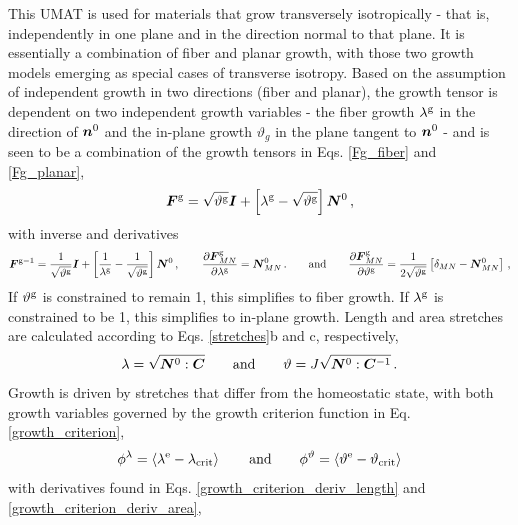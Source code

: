 \documentclass[10pt,letterpaper,oneside]{report}
\newcommand{\ten}[1]{\mbox{\boldmath $#1$}{}}
\newcommand{\scas}[1]{\mbox{{\scriptsize{${\rm{#1}}$}}}{}}
\begin{document}
This UMAT is used for materials that grow transversely isotropically - that is, independently in one plane and in the direction normal to that plane.  It is essentially a combination of fiber and planar growth, with those two growth models emerging as special cases of transverse isotropy.  Based on the assumption of independent growth in two directions (fiber and planar), the growth tensor is dependent on two independent growth variables - the fiber growth $\lambda^{\scas{g}}$ in the direction of $\ten{n}^0$ and the in-plane growth $\vartheta_g$ in the plane tangent to $\ten{n}^0$ - and is seen to be a combination of the growth tensors in Eqs. \ref{Fg_fiber} and \ref{Fg_planar},
\begin{equation}
\ten{F}^{\scas{g}} = \sqrt{\vartheta^{\scas{g}}} \ten{I} + \left[ \lambda^{\scas{g}} - \sqrt{\vartheta^{\scas{g}}} \right] \ten{N}^0 \, , 
\end{equation} 
with inverse and derivatives 
\begin{equation}
\ten{F}^{\scas{g}-1} = \frac{1}{\sqrt{\vartheta^{\scas{g}}}} \ten{I} + \left[ \frac{1}{\lambda^{\scas{g}}} - \frac{1}{\sqrt{\vartheta^{\scas{g}}}} \right] \ten{N}^0 \, ,
\qquad
\frac{\partial \ten{F}^{\scas{g}}_{MN} }{\partial \lambda^{\scas{g}}} = \ten{N}^0_{MN} \, .  
\qquad \mbox{and} \qquad
\frac{\partial \ten{F}^{\scas{g}}_{MN} }{\partial \vartheta^{\scas{g}}} = \frac{1}{2\sqrt{\vartheta^{\scas{g}}}} \left[ \delta_{MN} - \ten{N}^0_{MN} \right] \, ,
\end{equation}
If $\vartheta^{\scas{g}}$ is constrained to remain 1, this simplifies to fiber growth.  If $\lambda^{\scas{g}}$ is constrained to be 1, this simplifies to in-plane growth.  
Length and area stretches are calculated according to Eqs. \ref{stretches}b and c, respectively,
\begin{equation*}
\lambda = \sqrt{ \ten{N}^0 : \ten{C} } 
\qquad \mbox{and} \qquad 
\vartheta = J \sqrt{ \ten{N}^0 : \ten{C}^{-1} } \, . 
\end{equation*}
Growth is driven by stretches that differ from the homeostatic state, with both growth variables governed by the growth criterion function in Eq. \ref{growth_criterion},
\begin{equation*}
\phi^{\lambda} = \left\langle \lambda^{\scas{e}} - \lambda_{\scas{crit}} \right\rangle 
\qquad \mbox{and} \qquad 
\phi^{\vartheta} = \left\langle \vartheta^{\scas{e}} - \vartheta_{\scas{crit}} \right\rangle 
\end{equation*}
with derivatives found in Eqs. \ref{growth_criterion_deriv_length} and \ref{growth_criterion_deriv_area},
\end{document}
